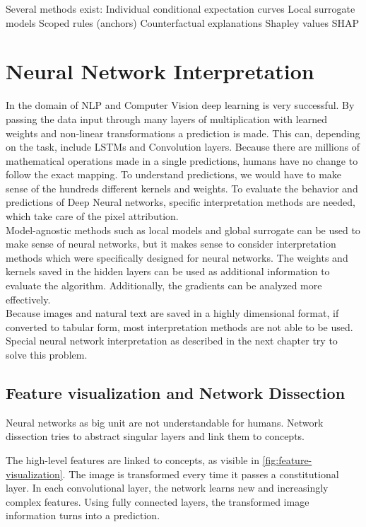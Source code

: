 Several methods exist: 
Individual conditional expectation curves
Local surrogate models
Scoped rules (anchors)
Counterfactual explanations
Shapley values
SHAP

\section{Neural Network Interpretation}

In the domain of NLP and Computer Vision deep learning is very successful. By passing the data input through many layers of multiplication with learned weights and non-linear transformations a prediction is made. This can, depending on the task, include LSTMs and Convolution layers. Because there are millions of mathematical operations made in a single predictions, humans have no change to follow the exact mapping. To understand predictions, we would have to make sense of the hundreds different kernels and weights. To evaluate the behavior and predictions of Deep Neural networks, specific interpretation methods are needed, which take care of the pixel attribution.
\\
Model-agnostic methods such as local models and global surrogate can be used to make sense of neural networks, but it makes sense to consider interpretation methods which were specifically designed for neural networks. The weights and kernels saved in the hidden layers can be used as additional information to evaluate the algorithm. Additionally, the gradients can be analyzed more effectively.
\\
Because images and natural text are saved in a highly dimensional format, if converted to tabular form, most interpretation methods are not able to be used. Special neural network interpretation as described in the next chapter try to solve this problem.

\subsection{Feature visualization and Network Dissection}

Neural networks as big unit are not understandable for humans. Network dissection tries to abstract singular layers and link them to concepts.

The high-level features are linked to concepts, as visible in \ref{fig:feature-visualization}. The image is transformed every time it passes a constitutional layer. In each convolutional layer, the network learns new and increasingly complex features. Using fully connected layers, the transformed image information turns into a prediction.

